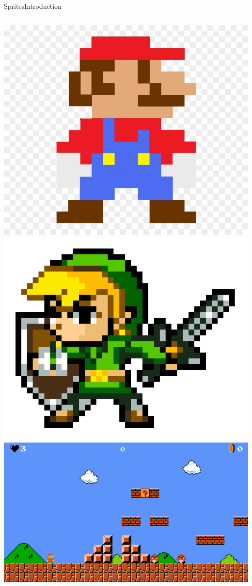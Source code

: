 \documentclass[10pt,compress]{beamer} %
\begin{document}
\begin{frame}{Sprites}{Introduction}
    \begin{columns}
			\includegraphics[width=\linewidth]{figs/mario.jpg}\\
			\includegraphics[width=\linewidth]{figs/zelda.png}\\
			\includegraphics[width=\linewidth]{figs/mario-screenshot.png}
   \end{columns}
\end{frame}
\end{document}
